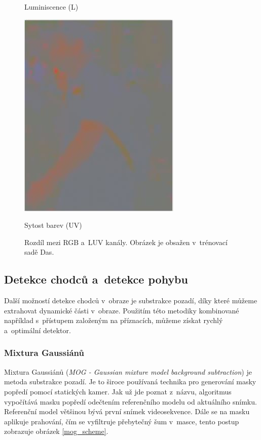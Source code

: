 \begin{figure}[H]
\begin{minipage}[b]{.3\textwidth}
  \caption*{Luminiscence (L)}
\end{minipage}
\begin{minipage}[b]{.3\textwidth}
  \centering
  \includegraphics[width=.8\linewidth]{figures/uv_chroma}
  \caption*{Sytost barev (UV)}
\end{minipage}
\caption{Rozdíl mezi RGB a~LUV kanály. Obrázek je obsažen v~trénovací sadě Das\cite{sudipdas}.}
\label{fig:luv}
\end{figure}

\subsection{Detekce chodců a~detekce pohybu} %
Další možností detekce chodců v~obraze je substrakce pozadí, díky které můžeme extrahovat dynamické části v~obraze. Použitím této metodiky kombinované například s~přístupem založeným na příznacích, můžeme získat rychlý a~optimální detektor.

\subsubsection*{Mixtura Gaussiánů}
Mixtura Gaussiánů (\textit{MOG - Gaussian mixture model background subtraction}) \cite{mog:zivkovic} je metoda substrakce pozadí. Je to široce používaná technika pro generování masky popředí pomocí statických kamer. Jak už jde poznat z~názvu, algoritmus vypočítává masku popředí odečtením referenčního modelu od aktuálního snímku. Referenční model většinou bývá první snímek videosekvence. Dále se na masku aplikuje prahování, čím se vyfiltruje přebytečný šum v~masce, tento postup zobrazuje obrázek \ref{mog_scheme}.

